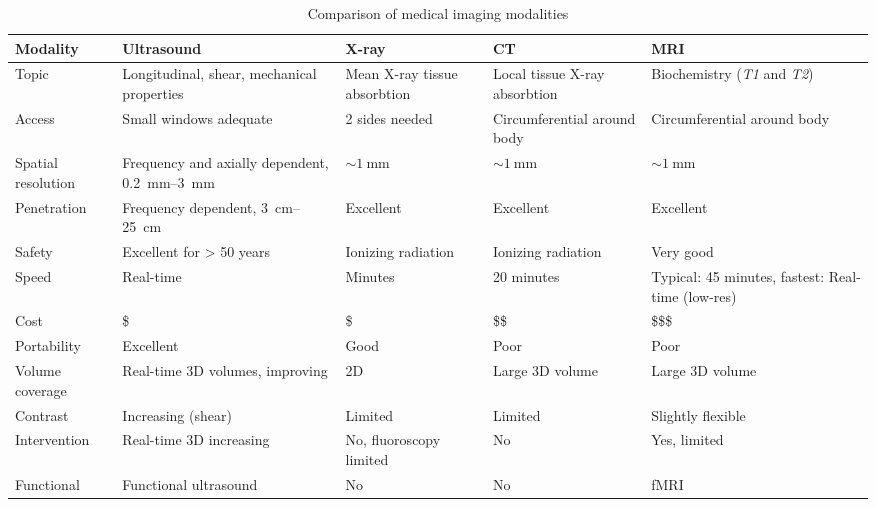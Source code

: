 \begin{table}[ht]
	\centering
	\begin{tabularx}{\textwidth}{@{}XXXXX@{}}
		\toprule
		\textbf{Modality} & \textbf{Ultrasound} & \textbf{X-ray} & \textbf{CT} & \textbf{MRI} \\ \midrule
		Topic              & Longitudinal, shear, mechanical properties              & Mean X-ray tissue absorbtion & Local tissue X-ray absorbtion & Biochemistry (\textit{T1} and \textit{T2})    \\
		Access             & Small windows adequate                                  & 2 sides needed               & Circumferential around body   & Circumferential around body \\
		Spatial resolution & Frequency and axially dependent, \qtyrange{0.2}{3}{\milli\meter} & $\sim \qty{1}{\milli \meter}$           & $\sim \qty{1}{\milli \meter}$            & $\sim \qty{1}{\milli \meter}$          \\
		Penetration     & Frequency dependent, \qtyrange{3}{25}{\centi\meter} & Excellent               & Excellent          & Excellent                                 \\
		Safety          & Excellent for > 50 years          & Ionizing radiation      & Ionizing radiation & Very good                                 \\
		Speed           & Real-time & Minutes & 20 minutes & Typical: 45 minutes, fastest: Real-time (\gls{low-res}) \\
		Cost            & \$                                            & \$                      & \$\$                 & \$\$\$                                       \\
		Portability     & Excellent                                     & Good                    & Poor               & Poor                                      \\
		Volume coverage & Real-time 3D volumes, improving               & 2D                      & Large 3D volume    & Large 3D volume                           \\
		Contrast        & Increasing (shear)                            & Limited                 & Limited            & Slightly flexible                         \\
		Intervention    & Real-time 3D increasing                       & No, fluoroscopy limited & No                 & Yes, limited                              \\
		Functional      & Functional ultrasound                         & No                      & No                 & fMRI                                      \\ \bottomrule
	\end{tabularx}
	\caption[Comparison of medical imaging modalities]{Comparison of medical imaging modalities \cite{Szabo_UltrasoundBook_2}}
	\label{tab:imaging_modalities}
\end{table}

